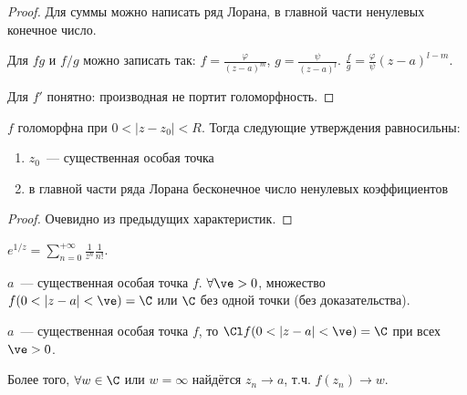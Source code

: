 \begin{proof}
    Для суммы можно написать ряд Лорана, в главной части ненулевых конечное число.

    Для $fg$ и $f/g$ можно записать так:
    $f = \frac{\varphi}{(z-a)^m}$, $g = \frac{\psi}{(z-a)^l}$.
    $\frac{f}{g} = \frac{\varphi}{\psi} (z-a)^{l-m}$.

    Для $f'$ понятно: производная не портит голоморфность.
\end{proof}

\begin{theorem}

    $f$ голоморфна при $0 < |z-z_0| < R$. Тогда
    следующие утверждения равносильны:

    \begin{enumerate}
        \item $z_0$~--- существенная особая точка
        \item в главной части ряда Лорана бесконечное число ненулевых коэффициентов
    \end{enumerate}
\end{theorem}

\begin{proof}
    Очевидно из предыдущих характеристик.
\end{proof}

\begin{consequence}
    $e^{1/z} = \sum\limits_{n=0}^{+\infty} \frac{1}{z^n} \frac{1}{n!}$.
\end{consequence}

\begin{theorem}[Пикар]

    $a$~--- существенная особая точка $f$.
    $\forall \ve > 0$, множество $f(0 < |z-a| < \ve)
        = \C$ или $\C$ без одной точки (без доказательства).
\end{theorem}

\begin{theorem}[Сохоцкий]

    $a$~--- существенная особая точка $f$,
    то $\Cl f(0 < |z-a| < \ve) = \C$ при всех $\ve > 0$.

    Более того, $\forall w \in \C$ или $w = \infty$
    найдётся $z_n \to a$, т.ч. $f(z_n) \to w$.
\end{theorem}

